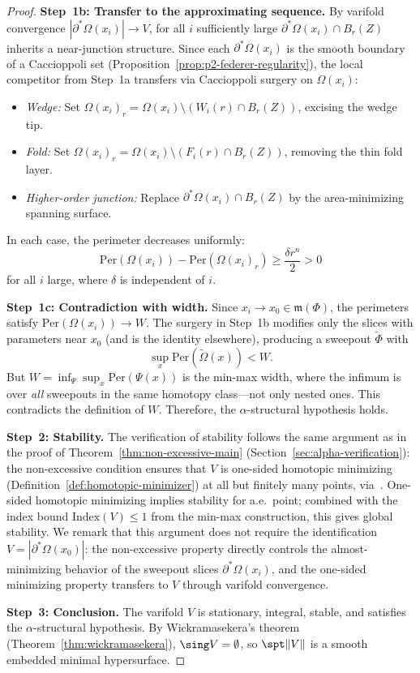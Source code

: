 \begin{proof}
\medskip\noindent\textbf{Step~1b: Transfer to the approximating sequence.}
By varifold convergence $|\partial^*\Omega(x_i)| \to V$, for all $i$ sufficiently large $\partial^*\Omega(x_i) \cap B_r(Z)$ inherits a near-junction structure. Since each $\partial^*\Omega(x_i)$ is the smooth boundary of a Caccioppoli set (Proposition~\ref{prop:p2-federer-regularity}), the local competitor from Step~1a transfers via Caccioppoli surgery on $\Omega(x_i)$:
\begin{itemize}
    \item \emph{Wedge:} Set $\Omega(x_i)_r = \Omega(x_i) \setminus (W_i(r) \cap B_r(Z))$, excising the wedge tip.
    \item \emph{Fold:} Set $\Omega(x_i)_r = \Omega(x_i) \setminus (F_i(r) \cap B_r(Z))$, removing the thin fold layer.
    \item \emph{Higher-order junction:} Replace $\partial^*\Omega(x_i) \cap B_r(Z)$ by the area-minimizing spanning surface.
\end{itemize}
In each case, the perimeter decreases uniformly:
\[
    \mathrm{Per}(\Omega(x_i)) - \mathrm{Per}(\Omega(x_i)_r) \geq \frac{\delta r^n}{2} > 0
\]
for all $i$ large, where $\delta$ is independent of $i$.

\medskip\noindent\textbf{Step~1c: Contradiction with width.}
Since $x_i \to x_0 \in \mathfrak{m}(\Phi)$, the perimeters satisfy $\mathrm{Per}(\Omega(x_i)) \to W$. The surgery in Step~1b modifies only the slices with parameters near $x_0$ (and is the identity elsewhere), producing a sweepout $\tilde{\Phi}$ with
\[
    \sup_x \mathrm{Per}(\tilde{\Omega}(x)) < W.
\]
But $W = \inf_{\Psi} \sup_x \mathrm{Per}(\Psi(x))$ is the min-max width, where the infimum is over \emph{all} sweepouts in the same homotopy class---not only nested ones. This contradicts the definition of $W$. Therefore, the $\alpha$-structural hypothesis holds.

\medskip\noindent\textbf{Step~2: Stability.}
The verification of stability follows the same argument as in the proof of Theorem~\ref{thm:non-excessive-main} (Section~\ref{sec:alpha-verification}): the non-excessive condition ensures that $V$ is one-sided homotopic minimizing (Definition~\ref{def:homotopic-minimizer}) at all but finitely many points, via~\cite[Proposition~3.1]{CLS22}. One-sided homotopic minimizing implies stability for a.e.\ point; combined with the index bound $\mathrm{Index}(V) \leq 1$ from the min-max construction, this gives global stability. We remark that this argument does not require the identification $V = |\partial^*\Omega(x_0)|$: the non-excessive property directly controls the almost-minimizing behavior of the sweepout slices $\partial^*\Omega(x_i)$, and the one-sided minimizing property transfers to $V$ through varifold convergence.

\medskip\noindent\textbf{Step~3: Conclusion.}
The varifold $V$ is stationary, integral, stable, and satisfies the $\alpha$-structural hypothesis. By Wickramasekera's theorem (Theorem~\ref{thm:wickramasekera}), $\sing V = \emptyset$, so $\spt\|V\|$ is a smooth embedded minimal hypersurface.
\end{proof}

